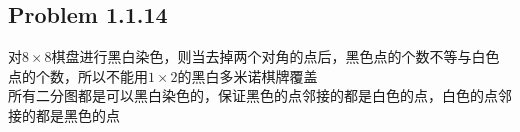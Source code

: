 \subsection*{Problem 1.1.14}
对$8 \times 8$棋盘进行黑白染色，则当去掉两个对角的点后，黑色点的个数不等与白色点的个数，所以不能用$1 \times 2$的黑白多米诺棋牌覆盖 \\
\indent 所有二分图都是可以黑白染色的，保证黑色的点邻接的都是白色的点，白色的点邻接的都是黑色的点

